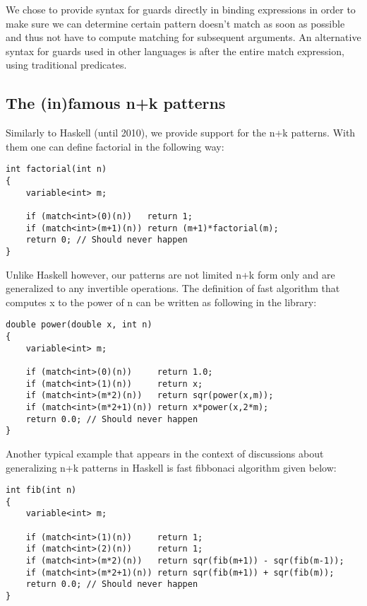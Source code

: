 \documentclass[preprint]{sigplanconf}
\begin{document}
We chose to provide syntax for guards directly in binding expressions in order 
to make sure we can determine certain pattern doesn't match as soon as possible 
and thus not have to compute matching for subsequent arguments. An alternative 
syntax for guards used in other languages is after the entire match expression, 
using traditional predicates.

\subsection{The (in)famous n+k patterns}

Similarly to Haskell (until 2010), we provide support for the n+k patterns. With 
them one can define factorial in the following way:

\begin{lstlisting}
int factorial(int n)
{
    variable<int> m;

    if (match<int>(0)(n))   return 1;
    if (match<int>(m+1)(n)) return (m+1)*factorial(m);
    return 0; // Should never happen
}
\end{lstlisting}

Unlike Haskell however, our patterns are not limited n+k form only and are 
generalized to any invertible operations. The definition of fast algorithm that 
computes x to the power of n can be written as following in the library:

\begin{lstlisting}
double power(double x, int n)
{
    variable<int> m;

    if (match<int>(0)(n))     return 1.0;
    if (match<int>(1)(n))     return x;
    if (match<int>(m*2)(n))   return sqr(power(x,m));
    if (match<int>(m*2+1)(n)) return x*power(x,2*m);
    return 0.0; // Should never happen
}
\end{lstlisting}

Another typical example that appears in the context of discussions about 
generalizing n+k patterns in Haskell is fast fibbonaci algorithm given below:

\begin{lstlisting}
int fib(int n)
{
    variable<int> m;

    if (match<int>(1)(n))     return 1;
    if (match<int>(2)(n))     return 1;
    if (match<int>(m*2)(n))   return sqr(fib(m+1)) - sqr(fib(m-1));
    if (match<int>(m*2+1)(n)) return sqr(fib(m+1)) + sqr(fib(m));
    return 0.0; // Should never happen
}
\end{lstlisting}
\end{document}
